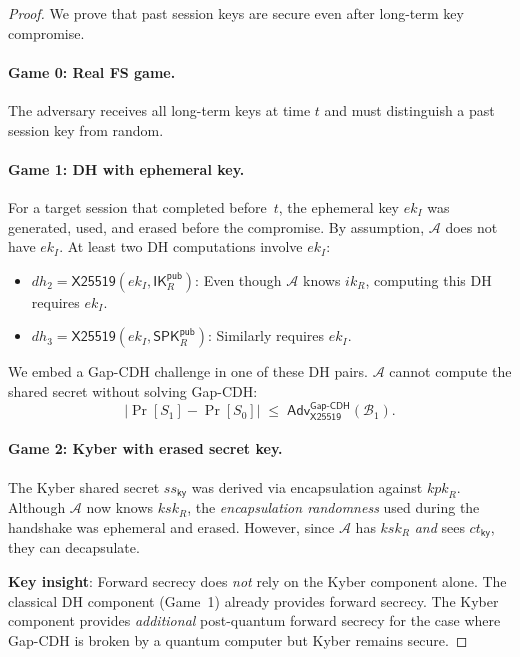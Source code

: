 \documentclass[11pt,a4paper]{article}
\theoremstyle{definition}
\theoremstyle{remark}
\newcommand{\adv}{\mathsf{Adv}}
\newcommand{\advA}{\mathcal{A}}
\newcommand{\advB}{\mathcal{B}}
\renewcommand{\DH}{\mathsf{X25519}}
\newcommand{\GapCDH}{\mathsf{Gap\text{-}CDH}}
\newcommand{\IK}{\mathsf{IK}}
\newcommand{\SPK}{\mathsf{SPK}}
\begin{document}
\begin{proof}
We prove that past session keys are secure even after long-term key compromise.

\paragraph{Game 0: Real FS game.}
The adversary receives all long-term keys at time $t$ and must distinguish
a past session key from random.

\paragraph{Game 1: DH with ephemeral key.}
For a target session that completed before~$t$, the ephemeral key $ek_I$
was generated, used, and erased before the compromise.  By assumption,
$\advA$ does not have $ek_I$.  At least two DH computations involve
$ek_I$:
\begin{itemize}[nosep]
  \item $\mathit{dh}_2 = \DH(ek_I, \IK_R^{\mathsf{pub}})$: Even though
        $\advA$ knows $ik_R$, computing this DH requires $ek_I$.
  \item $\mathit{dh}_3 = \DH(ek_I, \SPK_R^{\mathsf{pub}})$: Similarly
        requires $ek_I$.
\end{itemize}

We embed a Gap-CDH challenge in one of these DH pairs.  $\advA$ cannot
compute the shared secret without solving Gap-CDH:
\[
  |\Pr[S_1] - \Pr[S_0]| \;\leq\; \adv^{\GapCDH}_{\DH}(\advB_1).
\]

\paragraph{Game 2: Kyber with erased secret key.}
The Kyber shared secret $\mathit{ss}_{\mathsf{ky}}$ was derived via
encapsulation against $\mathit{kpk}_R$.  Although $\advA$ now knows
$\mathit{ksk}_R$, the \emph{encapsulation randomness} used during the
handshake was ephemeral and erased.  However, since $\advA$ has
$\mathit{ksk}_R$ \emph{and} sees $\mathit{ct}_{\mathsf{ky}}$, they can
decapsulate.

\textbf{Key insight}: Forward secrecy does \emph{not} rely on the Kyber
component alone.  The classical DH component (Game~1) already provides
forward secrecy.  The Kyber component provides \emph{additional}
post-quantum forward secrecy for the case where Gap-CDH is broken by a
quantum computer but Kyber remains secure.


\end{proof}
\end{document}
